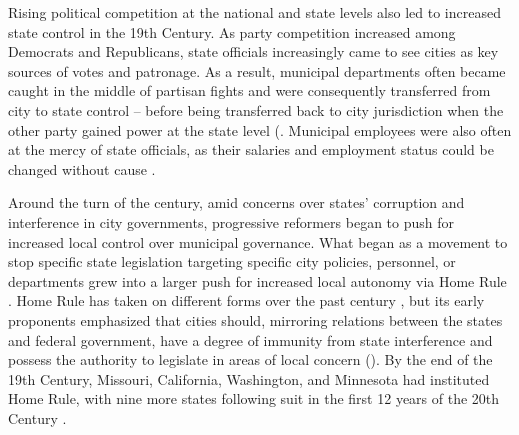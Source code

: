 \documentclass[12pt]{article}
\begin{document}
Rising political competition at the national and state levels also led to increased state control in the 19th Century. As party competition increased among Democrats and Republicans, state officials increasingly came to see cities as key sources of votes and patronage. As a result, municipal departments often became caught in the middle of partisan fights and were consequently transferred from city to state control -- before being transferred back to city jurisdiction when the other party gained power at the state level (\cites[p. 57-60]{bermanLocalGovernmentStates2003}[p. 11]{kraneHomeRuleAmerica2000}. Municipal employees were also often at the mercy of state officials, as their salaries and employment status could be changed without cause \parencite[p. 59]{bermanLocalGovernmentStates2003}.

Around the turn of the century, amid concerns over states' corruption and interference in city governments, progressive reformers began to push for increased local control over municipal governance. What began as a movement to stop specific state legislation targeting specific city policies, personnel, or departments grew into a larger push for increased local autonomy via Home Rule \parencite[p. 11]{kraneHomeRuleAmerica2000}. Home Rule has taken on different forms over the past century \parencite{richardsonDillonRuleMars2011}, but its early proponents emphasized that cities should, mirroring relations between the states and federal government, have a degree of immunity from state interference and possess the authority to legislate in areas of local concern (\cites[p. 11-12]{kraneHomeRuleAmerica2000}[p. 1124-1125]{dillerIntrastatePreemption2007}). By the end of the 19th Century, Missouri, California, Washington, and Minnesota had instituted Home Rule, with nine more states following suit in the first 12 years of the 20th Century \parencite[p. 11]{kraneHomeRuleAmerica2000}.
\end{document}
